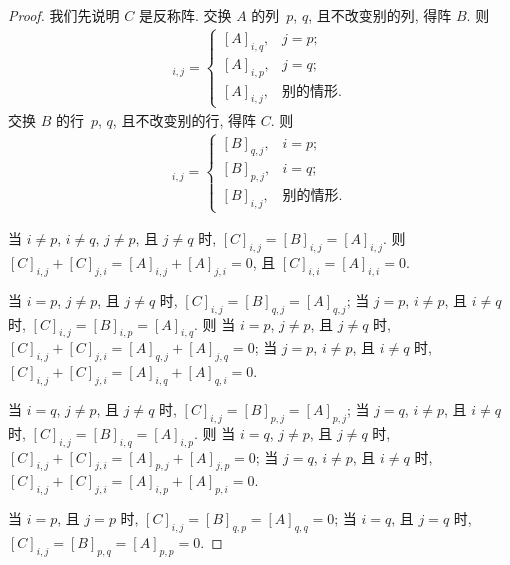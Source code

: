 \documentclass[../libro.tex]{subfiles}
\begin{document}
\begin{proof}
    我们先说明 \(C\) 是反称阵.
    交换 \(A\) 的列~\(p\), \(q\),
    且不改变别的列, 得阵 \(B\).
    则
    \begin{align*}
        [B]_{i,j} =
        \begin{cases}
            [A]_{i,q}, & j = p;       \\
            [A]_{i,p}, & j = q;       \\
            [A]_{i,j}, & \text{别的情形}.
        \end{cases}
    \end{align*}
    交换 \(B\) 的行~\(p\), \(q\),
    且不改变别的行, 得阵 \(C\).
    则
    \begin{align*}
        [C]_{i,j} =
        \begin{cases}
            [B]_{q,j}, & i = p;       \\
            [B]_{p,j}, & i = q;       \\
            [B]_{i,j}, & \text{别的情形}.
        \end{cases}
    \end{align*}

    当 \(i \neq p\), \(i \neq q\),
    \(j \neq p\), 且 \(j \neq q\) 时,
    \([C]_{i,j} = [B]_{i,j} = [A]_{i,j}\).
    则
    \([C]_{i,j} + [C]_{j,i}
    = [A]_{i,j} + [A]_{j,i} = 0\),
    且 \([C]_{i,i} = [A]_{i,i} = 0\).

    当 \(i = p\), \(j \neq p\), 且 \(j \neq q\) 时,
    \([C]_{i,j} = [B]_{q,j} = [A]_{q,j}\);
    当 \(j = p\), \(i \neq p\), 且 \(i \neq q\) 时,
    \([C]_{i,j} = [B]_{i,p} = [A]_{i,q}\).
    则%
    当 \(i = p\), \(j \neq p\), 且 \(j \neq q\) 时,
    \([C]_{i,j} + [C]_{j,i}
    = [A]_{q,j} + [A]_{j,q} = 0\);
    当 \(j = p\), \(i \neq p\), 且 \(i \neq q\) 时,
    \([C]_{i,j} + [C]_{j,i}
    = [A]_{i,q} + [A]_{q,i} = 0\).

    当 \(i = q\), \(j \neq p\), 且 \(j \neq q\) 时,
    \([C]_{i,j} = [B]_{p,j} = [A]_{p,j}\);
    当 \(j = q\), \(i \neq p\), 且 \(i \neq q\) 时,
    \([C]_{i,j} = [B]_{i,q} = [A]_{i,p}\).
    则%
    当 \(i = q\), \(j \neq p\), 且 \(j \neq q\) 时,
    \([C]_{i,j} + [C]_{j,i}
    = [A]_{p,j} + [A]_{j,p} = 0\);
    当 \(j = q\), \(i \neq p\), 且 \(i \neq q\) 时,
    \([C]_{i,j} + [C]_{j,i}
    = [A]_{i,p} + [A]_{p,i} = 0\).

    当 \(i = p\), 且 \(j = p\) 时,
    \([C]_{i,j} = [B]_{q,p} = [A]_{q,q} = 0\);
    当 \(i = q\), 且 \(j = q\) 时,
    \([C]_{i,j} = [B]_{p,q} = [A]_{p,p} = 0\).


\end{proof}
\end{document}
